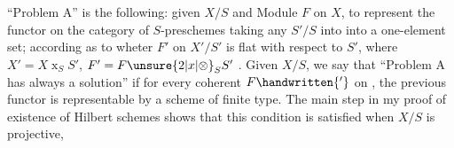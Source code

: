 ``Problem A'' is the following: given $X/S$ and  Module $F$ on $X$, to represent the functor on the category of $S$-preschemes taking any $S'/S$ into  into a one-element  set; according as to wheter $F'$ on $X'/S'$ is flat with respect to $S'$, where $X'=X\mathbin{x}_S S'$, $F'=F\unsure{2|x|\otimes}_S S'$ . Given $X/S$, we say that ``Problem A  has always a solution'' if for every coherent $F\handwritten{'}$ on , the previous functor  is representable by a scheme of finite type. The main step in my proof of existence of Hilbert schemes shows that this condition is satisfied when $X/S$ is projective,
